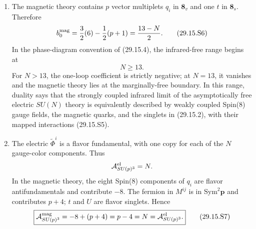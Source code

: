 \begin{enumerate}
\begin{enumerate}
    \item[(vi)] The magnetic theory contains \(p\) vector multiplets
    \(q_i\) in \(\boldsymbol8_v\) and one \(t\) in
    \(\boldsymbol8_s\).  Therefore
    \[
      b_0^{\rm mag}
       =\frac32(6)-\frac12(p+1)
       =\frac{13-N}{2}.
      \tag{29.15.S6}
    \]
    In the phase-diagram convention of (29.15.4), the infrared-free range
    begins at
    \[
      \boxed{N\geq13.}
    \]
    For \(N>13\), the one-loop coefficient is strictly negative; at
    \(N=13\), it vanishes and the magnetic theory lies at the
    marginally-free boundary.  In this range, duality says
    that the strongly coupled infrared limit of the asymptotically free
    electric \(SU(N)\) theory is equivalently described by weakly coupled
    Spin(8) gauge fields, the magnetic quarks, and the singlets in
    (29.15.2), with their mapped interactions (29.15.S5).

    \item[(vii)] The electric \(\widetilde\Phi^i\) is a flavor
    fundamental, with one copy for each of the \(N\) gauge-color
    components.  Thus
    \[
      \mathcal A_{SU(p)^3}^{\rm el}=N.
    \]
    In the magnetic theory, the eight Spin(8) components of \(q_i\) are
    flavor antifundamentals and contribute \(-8\).  The fermion in
    \(M^{ij}\) is in \(\mathrm{Sym}^2\boldsymbol p\) and contributes
    \(p+4\); \(t\) and \(U\) are flavor singlets.  Hence
    \[
      \boxed{\mathcal A_{SU(p)^3}^{\rm mag}
        =-8+(p+4)=p-4=N
        =\mathcal A_{SU(p)^3}^{\rm el}.}
      \tag{29.15.S7}
    \]
  \end{enumerate}

\end{enumerate}
